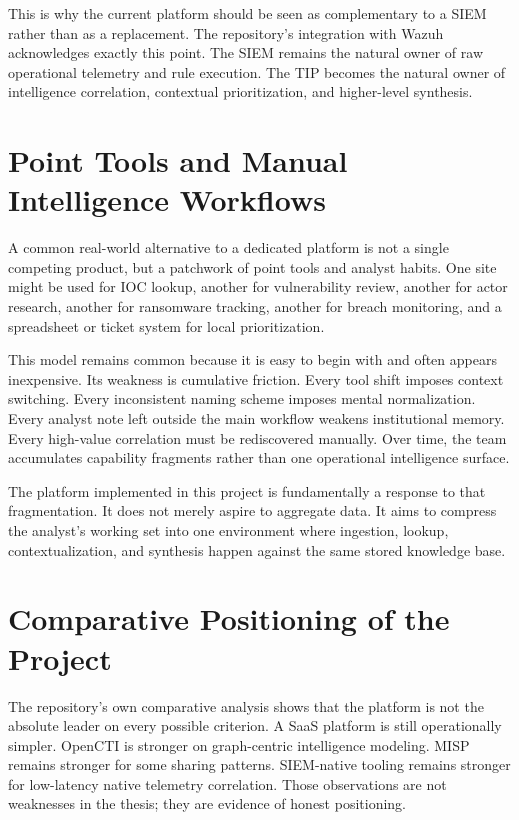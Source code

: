 This is why the current platform should be seen as complementary to a SIEM rather than as a replacement. The repository's integration with Wazuh acknowledges exactly this point. The SIEM remains the natural owner of raw operational telemetry and rule execution. The TIP becomes the natural owner of intelligence correlation, contextual prioritization, and higher-level synthesis.

\section{Point Tools and Manual Intelligence Workflows}
A common real-world alternative to a dedicated platform is not a single competing product, but a patchwork of point tools and analyst habits. One site might be used for IOC lookup, another for vulnerability review, another for actor research, another for ransomware tracking, another for breach monitoring, and a spreadsheet or ticket system for local prioritization.

This model remains common because it is easy to begin with and often appears inexpensive. Its weakness is cumulative friction. Every tool shift imposes context switching. Every inconsistent naming scheme imposes mental normalization. Every analyst note left outside the main workflow weakens institutional memory. Every high-value correlation must be rediscovered manually. Over time, the team accumulates capability fragments rather than one operational intelligence surface.

The platform implemented in this project is fundamentally a response to that fragmentation. It does not merely aspire to aggregate data. It aims to compress the analyst's working set into one environment where ingestion, lookup, contextualization, and synthesis happen against the same stored knowledge base.

\section{Comparative Positioning of the Project}
The repository's own comparative analysis shows that the platform is not the absolute leader on every possible criterion. A SaaS platform is still operationally simpler. OpenCTI is stronger on graph-centric intelligence modeling. MISP remains stronger for some sharing patterns. SIEM-native tooling remains stronger for low-latency native telemetry correlation. Those observations are not weaknesses in the thesis; they are evidence of honest positioning.

